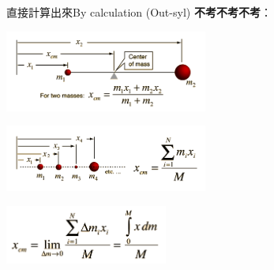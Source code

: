 \documentclass[beamer=true]{standalone}
\begin{document}
\begin{frame}{直接計算出來By calculation (Out-syl)}
    \textbf{不考不考不考}：
    {\par\centering
    \includegraphics[width=0.5\textwidth]{assets/aae43746.png}
    \par}
    {\par\centering
    \includegraphics[width=0.5\textwidth]{assets/23195dc5.png}
    \par}
    {\par\centering
    \includegraphics[width=0.4\textwidth]{assets/14123e56.png}
    \par}
\end{frame}
\end{document}
